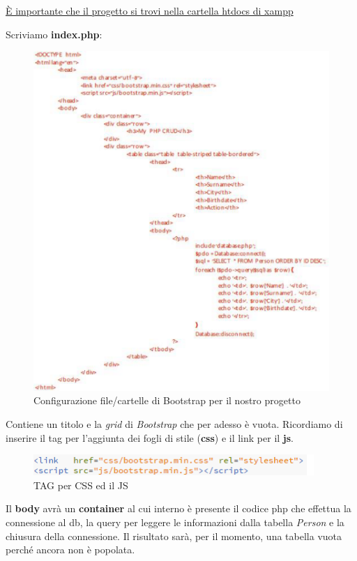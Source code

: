 \underline{È importante che il progetto si trovi nella cartella htdocs di xampp}

Scriviamo \textbf{index.php}:

\begin{center}
\begin{figure}[H]
\centering
\includegraphics[scale=1]{figures/indexphp.png}
\caption{Configurazione file/cartelle di Bootstrap per il nostro progetto} 
\end{figure}
\end{center} 

Contiene un titolo e la \textit{grid} di \textit{Bootstrap} che per adesso è vuota. Ricordiamo di inserire il tag per l’aggiunta dei fogli di stile (\textbf{css}) e il link per il \textbf{js}.

\begin{center}
\begin{figure}[H]
\centering
\includegraphics[scale=1]{figures/tagcssjs.png}
\caption{TAG per CSS ed il JS} 
\end{figure}
\end{center}

Il \textbf{body} avrà un \textbf{container} al cui interno è presente il codice php che effettua la connessione al db, la query per leggere le informazioni dalla tabella \textit{Person} e la chiusura della connessione. Il risultato sarà, per il momento, una tabella vuota perché ancora non è popolata.   

